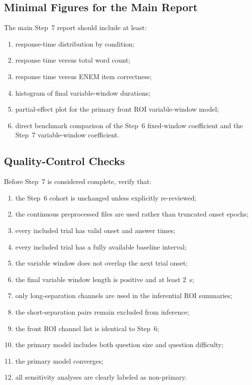 \subsection{Minimal Figures for the Main Report}
The main Step~7 report should include at least:
\begin{enumerate}
    \item response-time distribution by condition;
    \item response time versus total word count;
    \item response time versus ENEM item correctness;
    \item histogram of final variable-window durations;
    \item partial-effect plot for the primary front ROI variable-window model;
    \item direct benchmark comparison of the Step~6 fixed-window coefficient and the Step~7 variable-window coefficient.
\end{enumerate}

\subsection{Quality-Control Checks}
Before Step~7 is considered complete, verify that:
\begin{enumerate}
    \item the Step~6 cohort is unchanged unless explicitly re-reviewed;
    \item the continuous preprocessed files are used rather than truncated onset epochs;
    \item every included trial has valid onset and answer times;
    \item every included trial has a fully available baseline interval;
    \item the variable window does not overlap the next trial onset;
    \item the final variable window length is positive and at least 2~s;
    \item only long-separation channels are used in the inferential ROI summaries;
    \item the short-separation pairs remain excluded from inference;
    \item the front ROI channel list is identical to Step~6;
    \item the primary model includes both question size and question difficulty;
    \item the primary model converges;
    \item all sensitivity analyses are clearly labeled as non-primary.
\end{enumerate}

